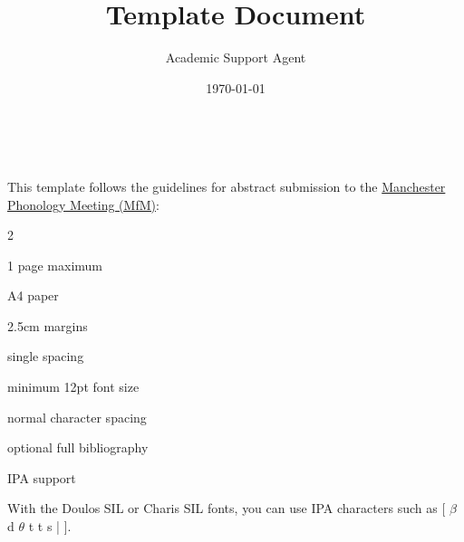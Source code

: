 \documentclass{article}
\title{Template Document}
\author{Academic Support Agent}
\date{\today}
\begin{document}
\maketitle

\thispagestyle{empty}
\begin{center}
    {\bfseries \titleoftheabstract{}}
    \\\vspace{0.16cm}
    \authorsandaffiliations{}
\end{center}\vspace{-0.16cm}





\noindent This template follows the guidelines for abstract submission to the \href{http://www.lel.ed.ac.uk/mfm/mfm.html}{Manchester Phonology Meeting (MfM)}:
\begin{multicols}{2}
    \begin{itemize*}
        \item 1 page maximum
        \item A4 paper
        \item 2.5cm margins
        \item single spacing
        \item minimum 12pt font size
        \item normal character spacing
        \item optional full bibliography
        \item IPA support
    \end{itemize*}
\end{multicols}

\noindent With the Doulos SIL or Charis SIL fonts, you can use IPA characters such as [        $\beta$           d                                                                                                          $\theta$ t  t s                                           |                                                                                                            ].\\
\end{document}
